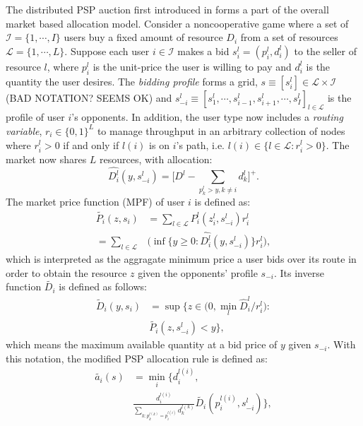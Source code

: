 \documentclass[12pt]{article}
\theoremstyle{definition}
\newcommand{\mcL}{\mathcal{L}}
\newcommand{\mcI}{\mathcal{I}}
\begin{document}
\begin{multicols}{2}
The distributed PSP auction first introduced in \cite{lazar} forms a part of the
overall market based allocation model. Consider a noncooperative game
where a set of $\mcI = \lbrace 1,\cdots,I\rbrace$ users buy a fixed
amount of resource $D_i$ from a set of resources $\mcL = \lbrace 1,\cdots,L\rbrace$. Suppose
each user $i \in \mcI$ makes a bid $s_i^l = (p_i^l, d_i^l)$ to the
seller of resource $l$,
where $p_i^l$ is the unit-price the user is willing to pay and $d_i^l$ is the
quantity the user desires. The \emph{bidding profile} forms a grid, $s \equiv
[s_i^l] \in \mcL \times \mcI$ (BAD NOTATION?
SEEMS OK)  and $s_{−i}^l \equiv [s_1^l , \cdots , s_{i−1}^l , s_{i+1}^l , \cdots
, s_I^l]_{l\in\mcL}$ is
the profile of user $i$’s opponents. In addition, the user type now includes a
\emph{routing variable}, $r_i\in\lbrace 0, 1\rbrace^L$ to manage throughput in
an arbitrary collection of nodes where $r_i^l >0$ if and only if $l(i)$ is on
$i$'s path, i.e. $l(i) \in \lbrace l\in \mcL : r_i^l >0\rbrace$. 
The market now shares $L$ resources, with allocation:
$$
    \hat{D_i^l}(y,s_{-i}^l) = \bigg\lbrack D^l -
\displaystyle\sum_{p_k^l > y, k\ne i} d_k^l\bigg\rbrack^+.
$$
The market price function (MPF) of user $i$ is defined as:
\begin{align*}
    \tilde{P_i}(z, s_i) &= \displaystyle\sum_{l\in\mcL}P_i^l(z_i^l,
s_{-i}^l)r_i^l \\
    = \displaystyle\sum_{l\in\mcL}&\bigg(\inf\bigg\lbrace y\ge 0 :
\hat{D_i^l}(y,s_{-i}^l)\bigg\rbrace r_i^l\bigg),
\end{align*}
which is interpreted as the aggragate minimum price a user bids over its route in order to obtain the
resource $z$ given the opponents’ profile $s_{−i}$. Its inverse function
$\tilde{D_i}$ is defined as follows:
\begin{align*}
    \tilde{D}_i(y, s_i) &= \sup\bigg\lbrace z\in \bigg( 0,
\min_l\hat{D}_i^l/r_i^l\bigg) : \\
    &\tilde{P_i}(z,s_{-i}^l) < y\bigg\rbrace,
\end{align*}
which means the maximum available quantity at a bid price of $y$ given
$s_{−i}$. With this notation, the modified PSP allocation rule \cite{tuffin} is defined
as:
\begin{align*}
    \tilde{a_i}(s) &= \min_i\big\lbrace d_i^{l(i)}, \\
 &\frac{d_i^{l(i)}}{\sum_{k:p_k^{l(k)}=p_i^{l(i)}}d_k^{l(k)}} \tilde{D_i}(p_i^{l(i)},
s_{-i}^l)\big\rbrace,
\end{align*}

\end{multicols}
\end{document}
